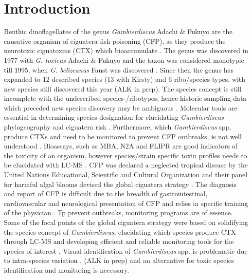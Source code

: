 \documentclass[12pt]{article}
\begin{document}
\section{Introduction}
Benthic dinoflagellates of the genus \emph{Gambierdiscus} Adachi \& Fukuyo are the causative organism of ciguatera fish poisoning (CFP), as they produce the neurotoxic ciguatoxins (CTX) which bioaccumulate \citep{chinain1997intraspecific,holmes1998gambierdiscus}. The genus was discovered in 1977 with \emph{G. toxicus} Adachi \& Fukuyo \citep{adachi1979thecal} and the taxon was considered monotypic till 1995, when \emph{G. belizeanus} Faust was discovered \citep{faust1995observation}. Since then the genus has expanded to 12 described species (13 with Kirsty) and 6 ribo/species types, with new species still discovered this year \citep{litaker2010global,adachi1979thecal,faust1995observation,chinain1999morphology,litaker2009taxonomy,nishimura2014morphology,fraga2011gambierdiscus,xu2014distribution,fraga2014genus} (ALK in prep). The species concept is still incomplete with the undescribed species-/ribotypes, hence historic sampling data which preceded new species discovery may be ambiguous \citep{berdalet2012global,nishimura2014morphology}. Molecular tools are essential in determining species designation for elucidating \emph{Gambierdiscus} phylogeography and ciguatera risk \citep{litaker2010global}. Furthermore, which \emph{Gambierdiscus} spp. produce CTXs and need to be monitored to prevent CFP outbreaks, is not well understood \citep{globalcig}. Bioassays, such as MBA, N2A and FLIPR are good indicators of the toxicity of an organism, however species/strain specific toxin profiles needs to be elucidated with LC-MS \citep{diogened2014chemistry}.
CFP was declared a neglected tropical disease by the United Nations Educational, Scientific and Cultural Organization and their panel for harmful algal blooms devised the global ciguatera strategy \citep{globalcig}.
The diagnosis and report of CFP is difficult due to the breadth of gastrointestinal, cardiovascular and neurological presentation of CFP and relies in specific training of the physician \citep{sims1987theoretical}. 
Tp prevent outbreaks, monitoring programs are of essence. Some of the focal points of the global ciguatera strategy were based on solidifying the species concept of \emph{Gambierdiscus}, elucidating which species produce CTX through LC-MS and developing efficient and reliable monitoring tools for the species of interest \citep{globalcig}. Visual identification of \emph{Gambierdiscus} spp. is problematic due to intra-species variation \citep{kohli2014high}, (ALK in prep) and an alternative for toxic species identification and monitoring is necessary.
\end{document}
